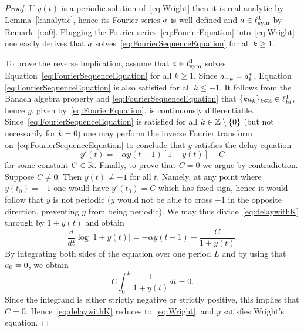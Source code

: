 \begin{proof}	
	If $y(t)$ is a periodic solution of~\eqref{eq:Wright} then it is real analytic by Lemma~\ref{l:analytic}, hence its Fourier series $a$ is well-defined and $a \in \ell^1_{\text{\textup{sym}}}$ by Remark~\ref{r:a0}.
	Plugging the Fourier series~\eqref{eq:FourierEquation} into~\eqref{eq:Wright} one easily derives that $a$ solves~\eqref{eq:FourierSequenceEquation} for all $k \geq 1$.

To prove the reverse implication, assume that $a \in \ell^1_{\text{\textup{sym}}}$ solves
Equation~\eqref{eq:FourierSequenceEquation} for all $k \geq 1$. Since $a_{-k}
= a_k^*$, Equation \eqref{eq:FourierSequenceEquation} is also satisfied for
all $k \leq -1$. It follows from the Banach algebra property and
\eqref{eq:FourierSequenceEquation} that $\{k a_k\}_{k \in \mathbb{Z}} \in \ell^1_{\text{\textup{bi}}}$,
hence $y$, given by~\eqref{eq:FourierEquation}, is continuously differentiable.
	Since~\eqref{eq:FourierSequenceEquation} is satisfied for all $k \in \mathbb{Z} \setminus \{0\}$ (but not necessarily for $k=0$) one may perform the inverse Fourier transform on~\eqref{eq:FourierSequenceEquation} to conclude that
	$y$ satisfies the delay equation 
\begin{equation}\label{eq:delaywithK}
   	y'(t) = - \alpha y(t-1) [ 1 + y(t)] + C
\end{equation}
	for some constant $C \in \mathbb{R}$. 
   Finally, to prove that $C=0$ we argue by contradiction.
   Suppose $C \neq 0$. Then $y(t) \neq -1$ for all $t$.
   Namely, at any point where $y(t_0) =-1$ one would have $y'(t_0) = C$
   which has fixed sign,   hence it would follow that $y$ is not periodic
   ($y$ would not be able to cross $-1$ in the opposite direction, 
   preventing $y$  from being periodic).  
  We may thus divide~\eqref{eq:delaywithK} through by $1 + y(t)$ and obtain 
\begin{equation*}
	\frac{d}{dt} \log | 1 + y(t) | = - \alpha y(t-1) + \frac{C}{1+y(t)} .
\end{equation*}
	By integrating both sides of the equation over one period $L$ and by using that $a_0=0$, we 
	obtain
	\[
	 C \int_0^L \frac{1}{1+y(t)} dt =0.
	\]
	Since the integrand is either strictly negative or strictly positive, this implies that $C=0$. Hence~\eqref{eq:delaywithK} reduces to~\eqref{eq:Wright},
	and $y$ satisfies Wright's equation. 
\end{proof}






